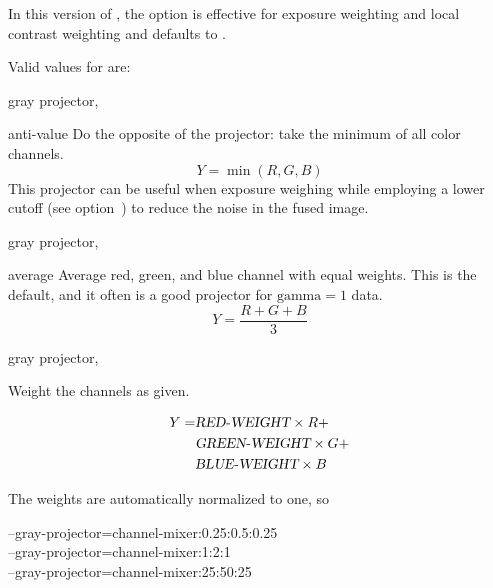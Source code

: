 \begin{codelist}
  In this version of \App{}, the option is effective for exposure
  weighting and local contrast weighting and 
  defaults to .

  Valid values for  are:
  \begin{codelist}
           {gray projector, }%
  \item[anti-value]\itemend Do the opposite of the 
    projector: take the minimum of all color channels.
    \[
    Y = \min(R, G, B)
    \]
    This projector can be useful when exposure weighing while
    employing a lower cutoff (see option~)
    to reduce the noise in the fused image.

           {gray projector, }%
  \item[average]\itemend Average red, green, and blue channel with
    equal weights.  This is the default, and it often is a good
    projector for $\mbox{gamma} = 1$ data.
    \[
    Y = \frac{R + G + B}{3}
    \]

           {gray projector, }%
  \item[\itempar{channel-mixer:\metavar{RED-WEIGHT}:\feasiblebreak
    \metavar{GREEN-WEIGHT}:\feasiblebreak\metavar{BLUE-WEIGHT}}]\itemend
    Weight the channels as given.

    \begin{align*}
      Y = & \textsl{RED-WEIGHT} \times R  + \\
      & \textsl{GREEN-WEIGHT} \times G + \\
      & \textsl{BLUE-WEIGHT} \times B
    \end{align*}

    The weights are automatically normalized to one, so

    \begin{literal}
      --gray-projector=channel-mixer:0.25:0.5:0.25 \\
      --gray-projector=channel-mixer:1:2:1 \\
      --gray-projector=channel-mixer:25:50:25
    \end{literal}


\end{codelist}
\end{codelist}
